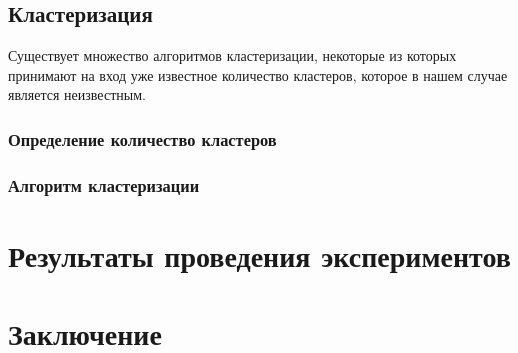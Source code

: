 \subsection{Кластеризация}

Существует множество алгоритмов кластеризации, некоторые из которых принимают на вход уже известное количество кластеров, которое в нашем случае является неизвестным.

\subsubsection{Определение количество кластеров}

\subsubsection{Алгоритм кластеризации}

\section{Результаты проведения экспериментов}

\section{Заключение}
